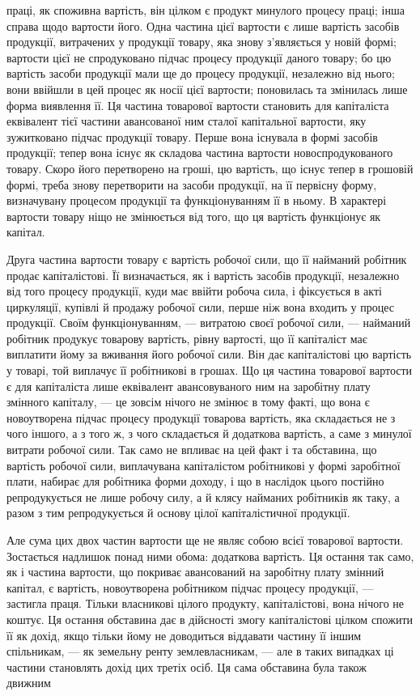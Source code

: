 \parcont{}  %
праці, як споживна вартість, він цілком є продукт минулого процесу
праці; інша справа щодо вартости його. Одна частина цієї вартости є
лише вартість засобів продукції, витрачених у продукції товару, яка
знову з’являється у новій формі; вартости цієї не спродуковано підчас
процесу продукції даного товару; бо цю вартість засоби продукції
мали ще до процесу продукції, незалежно від нього; вони ввійшли
в цей процес як носії цієї вартости; поновилась та змінилась лише
форма виявлення її. Ця частина товарової вартости становить для
капіталіста еквівалент тієї частини авансованої ним сталої капітальної
вартости, яку зужитковано підчас продукції товару. Перше вона
існувала в формі засобів продукції; тепер вона існує як складова
частина вартости новоспродукованого товару. Скоро його перетворено на
гроші, цю вартість, що існує тепер в грошовій формі, треба знову перетворити
на засоби продукції, на її первісну форму, визначувану процесом
продукції та функціонуванням її в ньому. В характері вартости
товару ніщо не змінюється від того, що ця вартість функціонує як
капітал.

Друга частина вартости товару є вартість робочої сили, що її найманий
робітник продає капіталістові. Її визначається, як і вартість засобів
продукції, незалежно від того процесу продукції, куди має ввійти
робоча сила, і фіксується в акті циркуляції, купівлі й продажу робочої
сили, перше ніж вона входить у процес продукції. Своїм функціонуванням,
— витратою своєї робочої сили, — найманий робітник продукує товарову
вартість, рівну вартості, що її капіталіст має виплатити йому за
вживання його робочої сили. Він дає капіталістові цю вартість у товарі,
той виплачує її робітникові в грошах. Що ця частина товарової вартости
є для капіталіста лише еквівалент авансовуваного ним на заробітну
плату змінного капіталу, — це зовсім нічого не змінює в тому факті, що
вона є новоутворена підчас процесу продукції товарова вартість, яка
складається не з чого іншого, а з того ж, з чого складається й додаткова
вартість, а саме з минулої витрати робочої сили. Так само не впливає
на цей факт і та обставина, що вартість робочої сили, виплачувана
капіталістом робітникові у формі заробітної плати, набирає для робітника
форми доходу, і що в наслідок цього постійно репродукується не лише
робочу силу, а й клясу найманих робітників як таку, а разом з тим
репродукується й основу цілої капіталістичної продукції.

Але сума цих двох частин вартости ще не являє собою всієї товарової
вартости. Зостається надлишок понад ними обома: додаткова вартість.
Ця остання так само, як і частина вартости, що покриває авансований
на заробітну плату змінний капітал, є вартість, новоутворена робітником
підчас процесу продукції, — застигла праця. Тільки власникові
цілого продукту, капіталістові, вона нічого не коштує. Ця остання обставина
дає в дійсності змогу капіталістові цілком спожити її як дохід, якщо
тільки йому не доводиться віддавати частину її іншим спільникам, — як
земельну ренту землевласникам, — але в таких випадках ці частини становлять
дохід цих третіх осіб. Ця сама обставина була також движним
\parbreak{}  %
